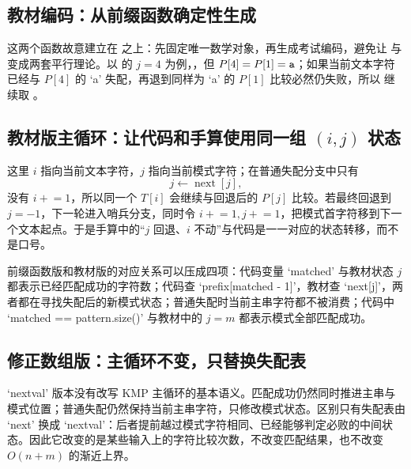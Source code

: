 \documentclass[UTF8,fontset=none,11pt,a4paper]{ctexart}
\begin{document}
\subsection{教材编码：从前缀函数确定性生成 }


这两个函数故意建立在  之上：先固定唯一数学对象，再生成考试编码，避免让  与  变成两套平行理论。以  的 $j=4$ 为例，，但 $P[4]=P[1]=\texttt{a}$；如果当前文本字符已经与 $P[4]$ 的 `a' 失配，再退到同样为 `a' 的 $P[1]$ 比较必然仍失败，所以  继续取 。

\subsection{教材版主循环：让代码和手算使用同一组 \texorpdfstring{$(i,j)$}{(i,j)} 状态}


这里 $i$ 指向当前文本字符，$j$ 指向当前模式字符；在普通失配分支中只有
\[
j\leftarrow\operatorname{next}[j],
\]
没有 $i\mathrel{+}=1$，所以同一个 $T[i]$ 会继续与回退后的 $P[j]$ 比较。若最终回退到 $j=-1$，下一轮进入哨兵分支，同时令 $i\mathrel{+}=1,j\mathrel{+}=1$，把模式首字符移到下一个文本起点。于是手算中的“$j$ 回退、$i$ 不动”与代码是一一对应的状态转移，而不是口号。

前缀函数版和教材版的对应关系可以压成四项：代码变量 `matched' 与教材状态 $j$ 都表示已经匹配成功的字符数；代码查 `prefix[matched - 1]'，教材查 `next[j]'，两者都在寻找失配后的新模式状态；普通失配时当前主串字符都不被消费；代码中 `matched == pattern.size()' 与教材中的 $j=m$ 都表示模式全部匹配成功。

\subsection{修正数组版：主循环不变，只替换失配表}


`nextval' 版本没有改写 KMP 主循环的基本语义。匹配成功仍然同时推进主串与模式位置；普通失配仍然保持当前主串字符，只修改模式状态。区别只有失配表由 `next' 换成 `nextval'：后者提前越过模式字符相同、已经能够判定必败的中间状态。因此它改变的是某些输入上的字符比较次数，不改变匹配结果，也不改变 $O(n+m)$ 的渐近上界。
\end{document}
